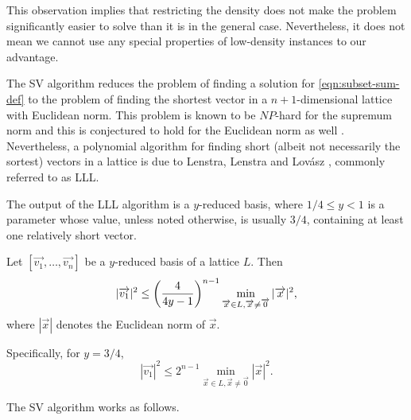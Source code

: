 This observation implies that restricting the density does not make the
problem significantly easier to solve than it is in the general case.
Nevertheless, it does not mean we cannot use any special properties of
low-density instances to our advantage.

The SV algorithm reduces the problem of finding a solution for
\eqref{eqn:subset-sum-def} to the problem of finding the shortest vector
in a $n+1$-dimensional lattice with Euclidean norm. This problem is known
to be $NP$-hard for the supremum norm and this is conjectured to hold for
the Euclidean norm as well \cite{van-emde-boas-shortest-vector}.
Nevertheless, a polynomial algorithm for finding short (albeit not
necessarily the sortest) vectors in a lattice is due to Lenstra, Lenstra
and Lovász \cite{LLL}, commonly referred to as LLL.

The output of the LLL algorithm is a $y$-reduced basis, where $1/4 \leq y
< 1$ is a parameter whose value, unless noted otherwise, is usually $3/4$,
containing at least one relatively short vector.

\begin{theorem}\label{theorem:LLL-short-vector}
    Let $[\vec{v_1}, \dots, \vec{v_n}]$ be a $y$-reduced basis of a
    lattice $L$. Then
    \begin{equation}\label{eqn:lll-y-reduced}
        |\vec{v_1}|^2 \leq \paren*{\frac{4}{4y-1}}^{n-1}
        \min\limits_{\vec{x} \in L, \vec{x} \not= \vec{0}} |\vec{x}|^2,
    \end{equation}
    where $|\vec{x}|$ denotes the Euclidean norm of $\vec{x}$.

    Specifically, for $y = 3/4$,
    \begin{equation}\label{eqn:lll-3/4-reduced}
        |\vec{v_1}|^2 \leq 2^{n-1} \min\limits_{\vec{x} \in L, \vec{x}
        \not= \vec{0}} |\vec{x}|^2.
    \end{equation}
\end{theorem}

The SV algorithm works as follows.

